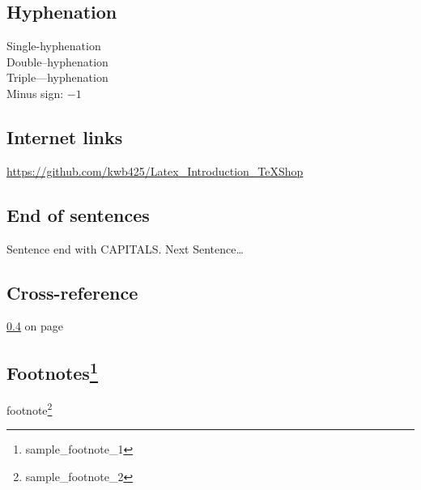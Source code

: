 \documentclass[12pt, oneside]{article}
\begin{document}
\subsection{Hyphenation}
Single-hyphenation \\ %
Double--hyphenation \\ %
Triple---hyphenation \\ %
Minus sign: $-1$ \\ %



\subsection{Internet links}
\url{https://github.com/kwb425/Latex_Introduction_TeXShop}



\subsection{End of sentences}
Sentence end with CAPITALS\@. 
Next Sentence\ldots 



\subsection{Cross-reference}
\label{sample_label_1}
\ref{sample_label_1} on page
~\pageref{sample_label_1} 



\subsection{Footnotes\protect\footnote{sample\_footnote\_1}} 
footnote\footnote{sample\_footnote\_2}
\end{document}
